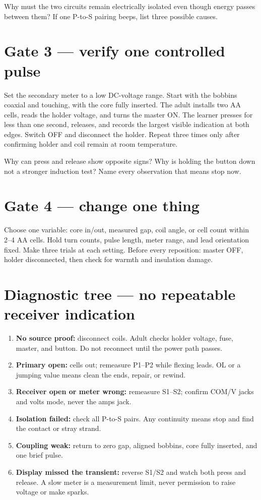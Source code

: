 \begin{predict}
Why must the two circuits remain electrically isolated even though energy
passes between them? If one P-to-S pairing beeps, list three possible causes.
\end{predict}

\proofmatrix

\section{Gate 3 --- verify one controlled pulse}
\pulseplate

Set the secondary meter to a low DC-voltage range. Start with the bobbins
coaxial and touching, with the core fully inserted. The adult installs two AA
cells, reads the holder voltage, and turns the master ON. The learner presses
for less than one second, releases, and records the largest visible indication
at both edges. Switch OFF and disconnect the holder. Repeat three times only
after confirming holder and coil remain at room temperature.

\begin{predict}
Why can press and release show opposite signs? Why is holding the button down
not a stronger induction test? Name every observation that means stop now.
\end{predict}

\section{Gate 4 --- change one thing}
Choose one variable: core in/out, measured gap, coil angle, or cell count
within 2--4 AA cells. Hold turn counts, pulse length, meter range, and lead
orientation fixed. Make three trials at each setting. Before every reposition:
master OFF, holder disconnected, then check for warmth and insulation damage.

\section{Diagnostic tree --- no repeatable receiver indication}
\begin{enumerate}
\item \textbf{No source proof:} disconnect coils. Adult checks holder voltage,
fuse, master, and button. Do not reconnect until the power path passes.
\item \textbf{Primary open:} cells out; remeasure P1--P2 while flexing leads.
OL or a jumping value means clean the ends, repair, or rewind.
\item \textbf{Receiver open or meter wrong:} remeasure S1--S2; confirm COM/V
jacks and volts mode, never the amps jack.
\item \textbf{Isolation failed:} check all P-to-S pairs. Any continuity means
stop and find the contact or stray strand.
\item \textbf{Coupling weak:} return to zero gap, aligned bobbins, core fully
inserted, and one brief pulse.
\item \textbf{Display missed the transient:} reverse S1/S2 and watch both press
and release. A slow meter is a measurement limit, never permission to raise
voltage or make sparks.
\end{enumerate}

